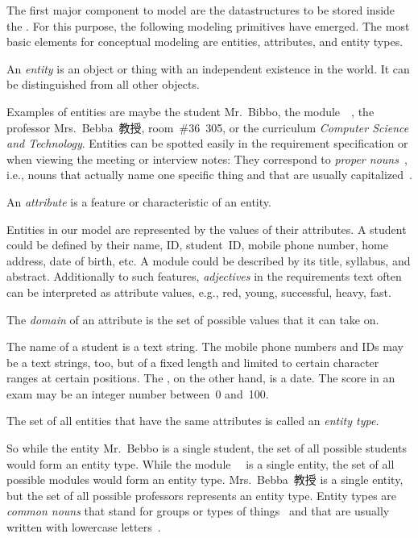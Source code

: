 %
%
\label{sec:entitisAttrsErd}%
%
The first major component to model are the datastructures to be stored inside the \db.
For this purpose, the following modeling primitives have emerged.
The most basic elements for conceptual modeling are entities, attributes, and entity types.%
%
\begin{definition}[Entity]%
\label{def:entity}%
An \emph{entity} is an object or thing with an independent existence in the world. %
It can be distinguished from all other objects.%
\end{definition}%
%
Examples of entities are maybe the student Mr.~Bibbo, the module~~\cite{programmingWithPython}, the professor Mrs.~Bebba~教授, room~\#36~305, or the curriculum \emph{Computer Science and Technology}.
Entities can be spotted easily in the requirement specification or when viewing the meeting or interview notes:
They correspond to \emph{proper nouns}~\cite{S2024D:CDMERDE}, i.e., nouns that actually name one specific thing and that are usually capitalized~\cite{EOWM2025MWAMTD:CAPNWTDLWOGC}.%
%
\begin{definition}[Attribute]%
An \emph{attribute} is a feature or characteristic of an entity.%
\end{definition}%
%
Entities in our model are represented by the values of their attributes.
A student could be defined by their name, ID, student~ID, mobile phone number, home address, date of birth, etc.
A module could be described by its title, syllabus, and abstract.
Additionally to such features, \emph{adjectives} in the requirements text often can be interpreted as attribute values, e.g., red, young, successful, heavy, fast.%
%
\begin{definition}[Domain]%
The \emph{domain} of an attribute is the set of possible values that it can take on.%
\end{definition}%
%
The name of a student is a text string.
The mobile phone numbers and IDs may be a text strings, too, but of a fixed length and limited to certain character ranges at certain positions.
The , on the other hand, is a date.
The score in an exam may be an integer number between~0 and~100.%
%
\begin{definition}%
\label{def:entityType}%
The set of all entities that have the same attributes is called an \emph{entity type}.%
\end{definition}%
%
So while the entity Mr.~Bebbo is a single student, the set of all possible students would form an entity type.
While the module~~\cite{programmingWithPython} is a single entity, the set of all possible modules would form an entity type.
Mrs.~Bebba~教授 is a single entity, but the set of all possible professors represents an entity type.
Entity types are \emph{common nouns} that stand for groups or types of things~\cite{S2024D:CDMERDE} and that are usually written with lowercase letters~\cite{EOWM2025MWAMTD:CAPNWTDLWOGC}.

